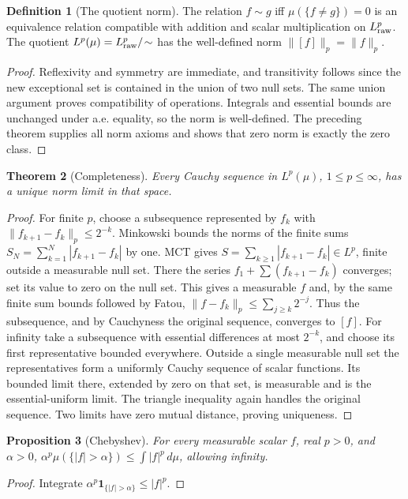 \documentclass[11pt,oneside,openany]{book}
\newtheorem{theorem}{Theorem}[chapter]
\newtheorem{proposition}[theorem]{Proposition}
\theoremstyle{definition}
\newtheorem{definition}[theorem]{Definition}
\theoremstyle{remark}
\newcommand{\one}{\mathbf1}\newcommand{\ind}[1]{\mathbf1_{#1}}
\newcommand{\family}[1]{}
\begin{document}
\begin{definition}[The quotient norm]\family{D11.10.quotient_construction}\label{d11:10:quotient-construction}
The relation $f\sim g$ iff $\mu(\{f\ne g\})=0$ is an equivalence relation
compatible with addition and scalar multiplication on $L^p_{\rm raw}$.
The quotient $L^p(\mu)=L^p_{\rm raw}/\!\sim$ has the well-defined norm
$\|[f]\|_p=\|f\|_p$.
\end{definition}
\begin{proof}
Reflexivity and symmetry are immediate, and transitivity follows since the
new exceptional set is contained in the union of two null sets. The same
union argument proves compatibility of operations. Integrals and essential
bounds are unchanged under a.e. equality, so the norm is well-defined.
The preceding theorem supplies all norm axioms and shows that zero norm
is exactly the zero class.
\end{proof}

\begin{theorem}[Completeness]\family{D11.10.completeness}\label{d11:10:completeness}
Every Cauchy sequence in $L^p(\mu)$, $1\leq p\leq\infty$, has a unique
norm limit in that space.
\end{theorem}
\begin{proof}
For finite $p$, choose a subsequence represented by $f_k$ with
$\|f_{k+1}-f_k\|_p\leq2^{-k}$. Minkowski bounds the norms of the finite
sums $S_N=\sum_{k=1}^N|f_{k+1}-f_k|$ by one. MCT gives
$S=\sum_{k\geq1}|f_{k+1}-f_k|\in L^p$, finite outside a measurable null
set. There the series $f_1+\sum(f_{k+1}-f_k)$ converges; set its value to
zero on the null set. This gives a measurable $f$ and, by the same finite
sum bounds followed by Fatou,
$\|f-f_k\|_p\leq\sum_{j\geq k}2^{-j}$. Thus the subsequence, and by
Cauchyness the original sequence, converges to $[f]$.
For infinity take a subsequence with essential differences at most $2^{-k}$,
and choose its first representative bounded everywhere.
Outside a single measurable null set the representatives form a uniformly
Cauchy sequence of scalar functions. Its bounded limit there, extended by
zero on that set, is measurable and is the essential-uniform limit.
The triangle inequality again handles the original sequence. Two limits
have zero mutual distance, proving uniqueness.
\end{proof}

\begin{proposition}[Chebyshev]\family{D11.10.chebyshev}\label{d11:10:chebyshev}
For every measurable scalar $f$, real $p>0$, and $\alpha>0$,
$\alpha^p\mu(\{|f|>\alpha\})\leq\int|f|^p\,d\mu$, allowing infinity.
\end{proposition}
\begin{proof}
Integrate $\alpha^p\one_{\{|f|>\alpha\}}\leq|f|^p$.
\end{proof}
\end{document}
